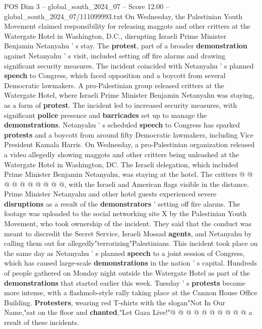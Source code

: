\begin{textsample}{POS Dim 3 – global\_south\_2024\_07 – Score 12.00 – global\_south\_2024\_07/111099993.txt}  \label{ex:f3_pos_309}
On Wednesday, the Palestinian Youth Movement claimed responsibility for releasing maggots and other critters at the Watergate Hotel in Washington, D.C., disrupting Israeli Prime Minister Benjamin Netanyahu ' s stay.
The \textbf{protest}, part of a broader \textbf{demonstration} against Netanyahu ' s visit, included setting off fire alarms and drawing significant security measures.
The incident coincided with Netanyahu ' s planned \textbf{speech} to Congress, which faced opposition and a boycott from several Democratic lawmakers.
A pro-Palestinian group released critters at the Watergate Hotel, where Israeli Prime Minister Benjamin Netanyahu was staying, as a form of \textbf{protest}.
The incident led to increased security measures, with significant \textbf{police} presence and \textbf{barricades} set up to manage the \textbf{demonstrations}.
Netanyahu ' s scheduled \textbf{speech} to Congress has sparked \textbf{protests} and a boycott from around fifty Democratic lawmakers, including Vice President Kamala Harris.
On Wednesday, a pro-Palestinian organization released a video allegedly showing maggots and other critters being unleashed at the Watergate Hotel in Washington, DC.
The Israeli delegation, which included Prime Minister Benjamin Netanyahu, was staying at the hotel.
The critters @ @ @ @ @ @ @ @ @ @, with the Israeli and American flags visible in the distance.
Prime Minister Netanyahu and other hotel guests experienced severe \textbf{disruptions} as a result of the \textbf{demonstrators} ' setting off fire alarms.
The footage was uploaded to the social networking site X by the Palestinian Youth Movement, who took ownership of the incident.
They said that the conduct was meant to discredit the Secret Service, Israeli Mossad \textbf{agents}, and Netanyahu by calling them out for allegedly"terrorizing"Palestinians.
This incident took place on the same day as Netanyahu ' s planned \textbf{speech} to a joint session of Congress, which has caused large-scale \textbf{demonstrations} in the nation ' s capital.
Hundreds of people gathered on Monday night outside the Watergate Hotel as part of the \textbf{demonstrations} that started earlier this week.
Tuesday ' s \textbf{protests} became more intense, with a flashmob-style rally taking place at the Cannon House Office Building. \textbf{Protesters}, wearing red T-shirts with the slogan"Not In Our Name,"sat on the floor and \textbf{chanted},"Let Gaza Live!"@ @ @ @ @ @ @ @ @ @ a result of these incidents.

\end{textsample}
